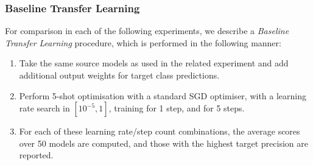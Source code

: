 \documentclass{report}
\begin{document}
\subsubsection{Baseline Transfer Learning}
For comparison in each of the following experiments, we describe a \textit{Baseline Transfer Learning} procedure, which is performed in the following manner:
\begin{enumerate}
	\item Take the same source models as used in the related experiment and add additional output weights for target class predictions.
	\item Perform 5-shot optimisation with a standard SGD optimiser, with a learning rate search in $[10^{-5}, 1]$, training for 1 step, and for 5 steps.
	\item For each of these learning rate/step count combinations, the average scores over 50 models are computed, and those with the highest target precision are reported.
\end{enumerate}
\end{document}
